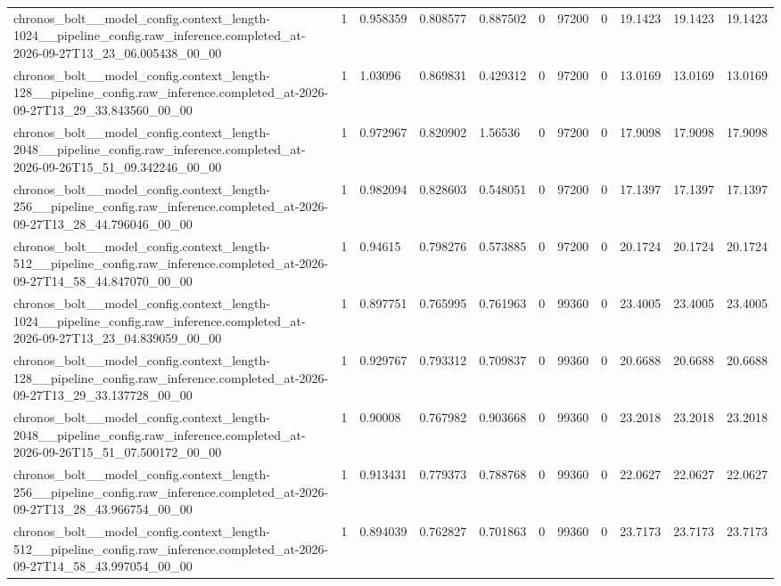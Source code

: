 \begin{tabular}{lllllllllll}
chronos\_bolt\_\_model\_config.context\_length-1024\_\_pipeline\_config.raw\_inference.completed\_at-2026-09-27T13\_23\_06.005438\_00\_00 & 1 & 0.958359 & 0.808577 & 0.887502 & 0 & 97200 & 0 & 19.1423 & 19.1423 & 19.1423 \\
chronos\_bolt\_\_model\_config.context\_length-128\_\_pipeline\_config.raw\_inference.completed\_at-2026-09-27T13\_29\_33.843560\_00\_00 & 1 & 1.03096 & 0.869831 & 0.429312 & 0 & 97200 & 0 & 13.0169 & 13.0169 & 13.0169 \\
chronos\_bolt\_\_model\_config.context\_length-2048\_\_pipeline\_config.raw\_inference.completed\_at-2026-09-26T15\_51\_09.342246\_00\_00 & 1 & 0.972967 & 0.820902 & 1.56536 & 0 & 97200 & 0 & 17.9098 & 17.9098 & 17.9098 \\
chronos\_bolt\_\_model\_config.context\_length-256\_\_pipeline\_config.raw\_inference.completed\_at-2026-09-27T13\_28\_44.796046\_00\_00 & 1 & 0.982094 & 0.828603 & 0.548051 & 0 & 97200 & 0 & 17.1397 & 17.1397 & 17.1397 \\
chronos\_bolt\_\_model\_config.context\_length-512\_\_pipeline\_config.raw\_inference.completed\_at-2026-09-27T14\_58\_44.847070\_00\_00 & 1 & 0.94615 & 0.798276 & 0.573885 & 0 & 97200 & 0 & 20.1724 & 20.1724 & 20.1724 \\
chronos\_bolt\_\_model\_config.context\_length-1024\_\_pipeline\_config.raw\_inference.completed\_at-2026-09-27T13\_23\_04.839059\_00\_00 & 1 & 0.897751 & 0.765995 & 0.761963 & 0 & 99360 & 0 & 23.4005 & 23.4005 & 23.4005 \\
chronos\_bolt\_\_model\_config.context\_length-128\_\_pipeline\_config.raw\_inference.completed\_at-2026-09-27T13\_29\_33.137728\_00\_00 & 1 & 0.929767 & 0.793312 & 0.709837 & 0 & 99360 & 0 & 20.6688 & 20.6688 & 20.6688 \\
chronos\_bolt\_\_model\_config.context\_length-2048\_\_pipeline\_config.raw\_inference.completed\_at-2026-09-26T15\_51\_07.500172\_00\_00 & 1 & 0.90008 & 0.767982 & 0.903668 & 0 & 99360 & 0 & 23.2018 & 23.2018 & 23.2018 \\
chronos\_bolt\_\_model\_config.context\_length-256\_\_pipeline\_config.raw\_inference.completed\_at-2026-09-27T13\_28\_43.966754\_00\_00 & 1 & 0.913431 & 0.779373 & 0.788768 & 0 & 99360 & 0 & 22.0627 & 22.0627 & 22.0627 \\
chronos\_bolt\_\_model\_config.context\_length-512\_\_pipeline\_config.raw\_inference.completed\_at-2026-09-27T14\_58\_43.997054\_00\_00 & 1 & 0.894039 & 0.762827 & 0.701863 & 0 & 99360 & 0 & 23.7173 & 23.7173 & 23.7173 \\

\end{tabular}
